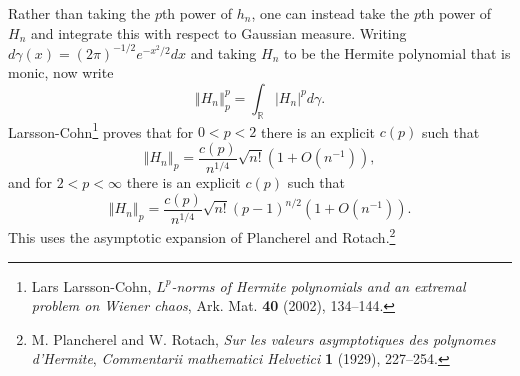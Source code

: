 \documentclass{article}
\newcommand{\norm}[1]{\left\Vert #1 \right\Vert}
\theoremstyle{definition}
\theoremstyle{definition}
\begin{document}
Rather than taking the $p$th power of $h_n$, one can instead take the $p$th power of $H_n$ and integrate this with respect to Gaussian measure. Writing
$d\gamma(x) = (2\pi)^{-1/2} e^{-x^2/2}dx$ and taking $H_n$ to be the Hermite polynomial that is monic, now write
\[
\norm{H_n}_p^p = \int_{\mathbb{R}} |H_n|^p d\gamma.
\]
Larsson-Cohn\footnote{Lars Larsson-Cohn, {\em $L^p$-norms of Hermite polynomials and an extremal problem on Wiener chaos},
Ark. Mat. \textbf{40} (2002), 134--144.} proves that for $0<p<2$ there is an explicit $c(p)$ such that 
\[
\norm{H_n}_p = \frac{c(p)}{n^{1/4}} \sqrt{n!} (1+O(n^{-1})),
\]
and for $2<p<\infty$ there is an explicit $c(p)$ such that
\[
\norm{H_n}_p = \frac{c(p)}{n^{1/4}} \sqrt{n!} (p-1)^{n/2} (1+O(n^{-1})).
\]
This uses the asymptotic expansion of Plancherel and Rotach.\footnote{M. Plancherel and W. Rotach, {\em Sur les valeurs asymptotiques des polynomes d'Hermite},
{\em Commentarii mathematici Helvetici} \textbf{1} (1929), 227--254.}
\end{document}
